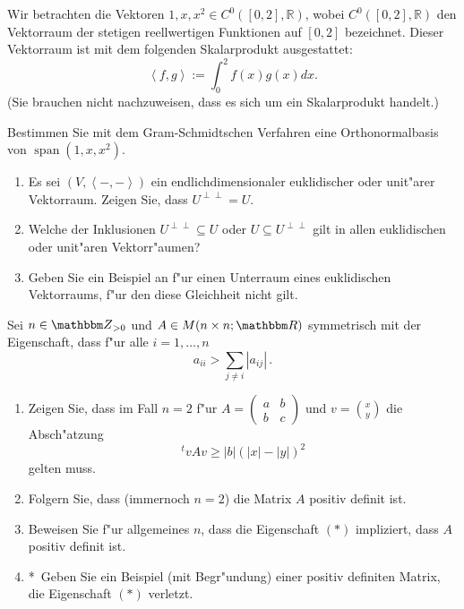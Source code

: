 \documentclass[a4,11pt]{article}
\DeclareMathOperator{\Span}{span}
\newcommand{\bonusitem}{\item\hspace*{-2.4mm}*\ }
\begin{document}
\vspace*{-17mm}
{
\kopf
}



\begin{aufgabe}[4 Punkte]
Wir betrachten die Vektoren $1,x,x^2 \in C^0([0,2],\mathbb{R})$, wobei $C^0([0,2],\mathbb{R})$ den Vektorraum der stetigen reellwertigen Funktionen auf $[0,2]$ bezeichnet. Dieser Vektorraum ist mit dem folgenden Skalarprodukt ausgestattet:
\[
\left<f,g\right> := \int_0^2 f(x)g(x)dx.
\]
(Sie brauchen nicht nachzuweisen, dass es sich um ein Skalarprodukt
handelt.)

Bestimmen Sie mit dem Gram-Schmidtschen Verfahren eine Orthonormalbasis von $\Span(1,x,x^2)$.
\end{aufgabe}

\begin{aufgabe}[4 Punkte]
\begin{enumerate}
\item Es sei $(V,\left<-,-\right>)$ ein endlichdimensionaler
  euklidischer oder unit"arer Vektorraum. Zeigen Sie, dass $U^{\perp
    \perp} = U$.
\item Welche der Inklusionen $U^{\perp \perp} \subseteq U$ oder $U
  \subseteq U^{\perp \perp}$ gilt in allen euklidischen oder unit"aren
  Vektorr"aumen?
\item Geben Sie ein Beispiel an f"ur einen Unterraum eines
  euklidischen Vektorraums, f"ur den diese Gleichheit nicht gilt.
\end{enumerate}
\end{aufgabe}

\begin{aufgabe}[4 Punkte]
Sei $n \in \Z_{>0}$ und $A \in M(n \times n; \R)$ symmetrisch mit der
Eigenschaft, dass f"ur alle $i=1, \ldots, n$
\begin{equation} \tag{$*$}
a_{ii} > \sum_{j \neq i} |a_{ij}| \,.
\end{equation}
\begin{enumerate}
\item Zeigen Sie, dass im Fall $n=2$ f"ur $A = \left(
    \begin{smallmatrix}
      a&b\\b&c
    \end{smallmatrix} \right)$ und $v = \binom{x}{y}$ die Absch"atzung
  $$
  ^t\!v A v \ge |b| (|x|-|y|)^2
  $$
  gelten muss.
\item Folgern Sie, dass (immernoch $n=2$) die Matrix $A$ positiv
  definit ist.
\item Beweisen Sie f"ur allgemeines $n$, dass die Eigenschaft $(*)$
  impliziert, dass $A$ positiv definit ist.
\bonusitem Geben Sie ein Beispiel (mit Begr"undung) einer positiv
definiten Matrix, die Eigenschaft $(*)$ verletzt.
\end{enumerate}
\end{aufgabe}
\end{document}
